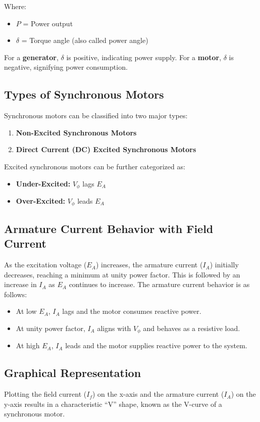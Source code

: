 \documentclass[a4paper,12pt]{article}
\begin{document}
	Where:
	\begin{itemize}
		\item $P$ = Power output
		\item $\delta$ = Torque angle (also called power angle)
	\end{itemize}
	
	For a \textbf{generator}, $\delta$ is positive, indicating power supply. For a \textbf{motor}, $\delta$ is negative, signifying power consumption.
	
	\subsection*{Types of Synchronous Motors}
	Synchronous motors can be classified into two major types:
	\begin{enumerate}
		\item \textbf{Non-Excited Synchronous Motors}
		\item \textbf{Direct Current (DC) Excited Synchronous Motors}
	\end{enumerate}
	
	Excited synchronous motors can be further categorized as:
	\begin{itemize}
		\item \textbf{Under-Excited:} $V_\phi$ lags $E_A$
		\item \textbf{Over-Excited:} $V_\phi$ leads $E_A$
	\end{itemize}
	
	\subsection*{Armature Current Behavior with Field Current}
	As the excitation voltage ($E_A$) increases, the armature current ($I_A$) initially decreases, reaching a minimum at unity power factor. This is followed by an increase in $I_A$ as $E_A$ continues to increase. The armature current behavior is as follows:
	\begin{itemize}
		\item At low $E_A$, $I_A$ lags and the motor consumes reactive power.
		\item At unity power factor, $I_A$ aligns with $V_\phi$ and behaves as a resistive load.
		\item At high $E_A$, $I_A$ leads and the motor supplies reactive power to the system.
	\end{itemize}
	
	\subsection*{Graphical Representation}
	Plotting the field current ($I_f$) on the x-axis and the armature current ($I_A$) on the y-axis results in a characteristic “V” shape, known as the V-curve of a synchronous motor.
	
\end{document}
